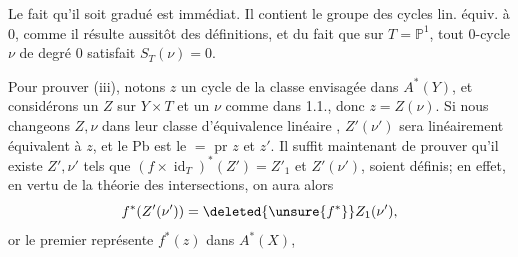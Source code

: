 Le fait qu'il soit gradué est immédiat. Il contient le groupe des cycles lin. équiv. à $0$, comme il résulte aussitôt des définitions, et du fait que sur $T=\mathbb P^1$, tout $0$-cycle $\nu$ de degré $0$ satisfait $S_T(\nu)=0$. 

Pour prouver (iii), notons $z$ un cycle de la classe envisagée dans $A^*(Y)$, et considérons un $Z$ sur $Y\times T$ et un $\nu$ comme dans 1.1., donc $z=Z(\nu)$. Si nous changeons $Z,\nu$ dans leur classe d'équivalence linéaire , $Z'(\nu')$ sera linéairement équivalent à $z$, et le Pb est le $=$ pr $z$ et $z'$. Il suffit maintenant de prouver  qu'il existe $Z',\nu'$ tels que $(f\times\operatorname{id}_T)^*(Z')=Z'_1$ et $Z'(\nu')$,  soient définis; en effet, en vertu de la théorie des intersections, on aura alors
\[
f^*(Z'(\nu'))=\deleted{\unsure{f^*}}Z_1(\nu'),
\]
or le premier   représente $f^*(z)$ dans $A^*(X)$, 


